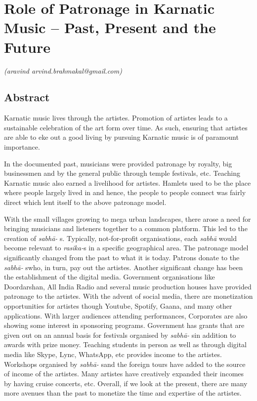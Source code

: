 
\chapter{Role of Patronage in Karnatic Music – Past, Present and the Future}\label{chapter8}


\begin{flushright}
\textit{(aravind arvind.brahmakal@gmail.com)} 
\end{flushright}


\section*{Abstract}

Karnatic music lives through the artistes. Promotion of artistes leads to a sustainable celebration of the art form over time. As such, ensuring that artistes are able to eke out a good living by pursuing Karnatic music is of paramount importance.

In the documented past, musicians were provided patronage by royalty, big businessmen and by the general public through temple festivals, etc. Teaching Karnatic music also earned a livelihood for artistes. Hamlets used to be the place where people largely lived in and hence, the people to people connect was fairly direct which lent itself to the above patronage model.

With the small villages growing to mega urban landscapes, there arose a need for bringing musicians and listeners together to a common platform. This led to the creation of \textit{sabhā-} s. Typically, not-for-profit organisations, each \textit{sabhā} would become relevant to\textit{ rasika-}s in a specific geographical area. The patronage model significantly changed from the past to what it is today. Patrons donate to the \textit{sabhā-} swho, in turn, pay out the artistes. Another significant change has been the establishment of the digital media. Government organisations like Doordarshan, All India Radio and several music production houses have provided patronage to the artistes. With the advent of social media, there are monetization opportunities for artistes though Youtube, Spotify, Gaana, and many other applications. With larger audiences attending performances, Corporates are also showing some interest in sponsoring programs. Government has grants that are given out on an annual basis for festivals organised by \textit{sabhā-} sin addition to awards with prize money. Teaching students in person as well as through digital media like Skype, Lync, WhatsApp, etc provides income to the artistes. Workshops organised by \textit{sabhā-} sand the foreign tours have added to the source of income of the artistes. Many artistes have creatively expanded their incomes by having cruise concerts, etc. Overall, if we look at the present, there are many more avenues than the past to monetize the time and expertise of the artistes.

